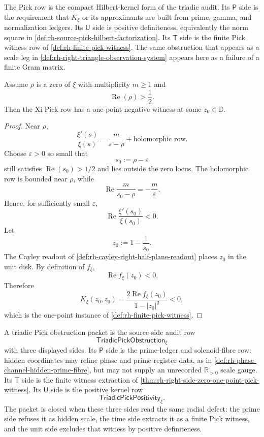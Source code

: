\begin{principle}
\label{prin:rh-triadic-meaning-pick-row}
The Pick row is the compact Hilbert-kernel form of the triadic audit.
Its $\mathsf P$ side is the requirement that $K_{\xi}$ or its
approximants are built from prime, gamma, and normalization ledgers.
Its $\mathsf U$ side is positive definiteness, equivalently the norm
square in \autoref{def:rh-source-pick-hilbert-factorization}.  Its
$\mathsf T$ side is the finite Pick witness row of
\autoref{def:rh-finite-pick-witness}.  The same obstruction that appears
as a scale leg in
\autoref{def:rh-right-triangle-observation-system} appears here as a
failure of a finite Gram matrix.
\end{principle}

\begin{theorem}
\label{thm:rh-right-side-zero-one-point-pick-witness}
Assume $\rho$ is a zero of $\xi$ with multiplicity $m\ge1$ and
$$
\operatorname{Re}(\rho)>\frac12.
$$
Then the Xi Pick row has a one-point negative witness at some
$z_0\in\mathbb D$.
\end{theorem}

\begin{proof}
Near $\rho$,
$$
\frac{\xi'(s)}{\xi(s)}
=
\frac{m}{s-\rho}
+
\text{holomorphic row}.
$$
Choose $\varepsilon>0$ so small that
$$
s_0:=\rho-\varepsilon
$$
still satisfies $\operatorname{Re}(s_0)>1/2$ and lies outside the zero
locus.  The holomorphic row is bounded near $\rho$, while
$$
\operatorname{Re}\frac{m}{s_0-\rho}
=
-\frac{m}{\varepsilon}.
$$
Hence, for sufficiently small $\varepsilon$,
$$
\operatorname{Re}\frac{\xi'(s_0)}{\xi(s_0)}<0.
$$
Let
$$
z_0:=1-\frac1{s_0}.
$$
The Cayley readout of \autoref{def:rh-cayley-right-half-plane-readout}
places $z_0$ in the unit disk.  By definition of $f_{\xi}$,
$$
\operatorname{Re}f_{\xi}(z_0)<0.
$$
Therefore
$$
K_{\xi}(z_0,z_0)
=
\frac{2\operatorname{Re}f_{\xi}(z_0)}{1-|z_0|^2}
<0,
$$
which is the one-point instance of
\autoref{def:rh-finite-pick-witness}.
\end{proof}

\begin{definition}
\label{def:rh-triadic-pick-obstruction-packet}
A triadic Pick obstruction packet is the source-side audit row
$$
\mathsf{TriadicPickObstruction}_{\xi}
$$
with three displayed sides.  Its $\mathsf P$ side is the
prime-ledger and solenoid-fibre row: hidden coordinates may refine
phase and prime-register data, as in
\autoref{def:rh-phase-channel-hidden-prime-fibre}, but may not supply
an unrecorded $\mathbb R_{>0}$ scale gauge.  Its $\mathsf T$ side is
the finite witness extraction of
\autoref{thm:rh-right-side-zero-one-point-pick-witness}.  Its
$\mathsf U$ side is the positive kernel row
$$
\mathsf{TriadicPickPositivity}_{\xi}.
$$
The packet is closed when these three sides read the same radial
defect: the prime side refuses it as hidden scale, the time side
extracts it as a finite Pick witness, and the unit side excludes that
witness by positive definiteness.
\end{definition}

